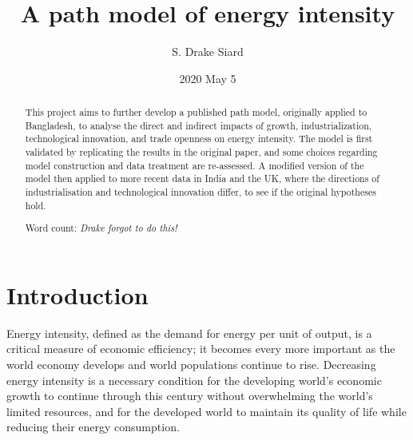 \documentclass[11pt]{article}
\title{\textbf{A path model of energy intensity}}
\author{S. Drake Siard}
\date{2020 May 5}
\begin{document}
\maketitle

\begin{abstract}
This project aims to further develop a published path model, originally applied to Bangladesh, to analyse the direct and indirect impacts of growth, industrialization, technological innovation, and trade openness on energy intensity.
The model is first validated by replicating the results in the original paper, and some choices regarding model construction and data treatment are re-assessed.
A modified version of the model then applied to more recent data in India and the UK, where the directions of industrialisation and technological innovation differ, to see if the original hypotheses hold.

Word count: \em{Drake forgot to do this!}
 
\end{abstract}

\tableofcontents

\pagebreak

\section{Introduction}\label{sec:introduction}

Energy intensity, defined as the demand for energy per unit of output, is a critical measure of economic efficiency; it becomes every more important as the world economy develops and world populations continue to rise.
Decreasing energy intensity is a necessary condition for the developing world's economic growth to continue through this century without overwhelming the world's limited resources, and for the developed world to maintain its quality of life while reducing their energy consumption.
\end{document}
